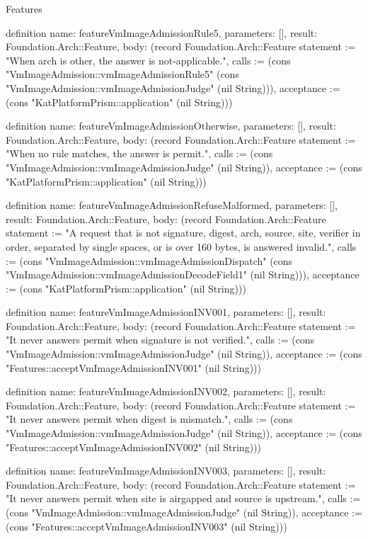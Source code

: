 \begin{lexlean}{Features}
\begin{semanticmodule}
definition{
  name: featureVmImageAdmissionRule5,
  parameters: [],
  result: Foundation.Arch::Feature,
  body: (record Foundation.Arch::Feature {statement := "When arch is other, the answer is not-applicable.", calls := (cons "VmImageAdmission::vmImageAdmissionRule5" (cons "VmImageAdmission::vmImageAdmissionJudge" (nil String))), acceptance := (cons "KatPlatformPrism::application" (nil String))})
}

definition{
  name: featureVmImageAdmissionOtherwise,
  parameters: [],
  result: Foundation.Arch::Feature,
  body: (record Foundation.Arch::Feature {statement := "When no rule matches, the answer is permit.", calls := (cons "VmImageAdmission::vmImageAdmissionJudge" (nil String)), acceptance := (cons "KatPlatformPrism::application" (nil String))})
}

definition{
  name: featureVmImageAdmissionRefuseMalformed,
  parameters: [],
  result: Foundation.Arch::Feature,
  body: (record Foundation.Arch::Feature {statement := "A request that is not signature, digest, arch, source, site, verifier in order, separated by single spaces, or is over 160 bytes, is answered invalid.", calls := (cons "VmImageAdmission::vmImageAdmissionDispatch" (cons "VmImageAdmission::vmImageAdmissionDecodeField1" (nil String))), acceptance := (cons "KatPlatformPrism::application" (nil String))})
}

definition{
  name: featureVmImageAdmissionINV001,
  parameters: [],
  result: Foundation.Arch::Feature,
  body: (record Foundation.Arch::Feature {statement := "It never answers permit when signature is not verified.", calls := (cons "VmImageAdmission::vmImageAdmissionJudge" (nil String)), acceptance := (cons "Features::acceptVmImageAdmissionINV001" (nil String))})
}

definition{
  name: featureVmImageAdmissionINV002,
  parameters: [],
  result: Foundation.Arch::Feature,
  body: (record Foundation.Arch::Feature {statement := "It never answers permit when digest is mismatch.", calls := (cons "VmImageAdmission::vmImageAdmissionJudge" (nil String)), acceptance := (cons "Features::acceptVmImageAdmissionINV002" (nil String))})
}

definition{
  name: featureVmImageAdmissionINV003,
  parameters: [],
  result: Foundation.Arch::Feature,
  body: (record Foundation.Arch::Feature {statement := "It never answers permit when site is airgapped and source is upstream.", calls := (cons "VmImageAdmission::vmImageAdmissionJudge" (nil String)), acceptance := (cons "Features::acceptVmImageAdmissionINV003" (nil String))})
}


\end{semanticmodule}
\end{lexlean}
